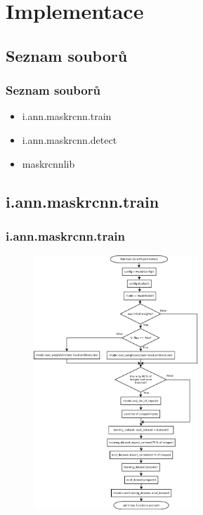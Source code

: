 \documentclass{beamer}
\begin{document}

\section{Implementace}

\subsection{Seznam souborů}

\begin{frame}

\frametitle{Seznam souborů}

\begin{itemize}
	\item i.ann.maskrcnn.train
	\item i.ann.maskrcnn.detect
	\item maskrcnnlib
\end{itemize}

\end{frame}


\subsection{i.ann.maskrcnn.train}

\begin{frame}

\frametitle{i.ann.maskrcnn.train}

\begin{figure}[ht]
	\includegraphics[width=0.55\textwidth]{pictures/train_dia.png}
\end{figure}
\end{frame}
\end{document}
